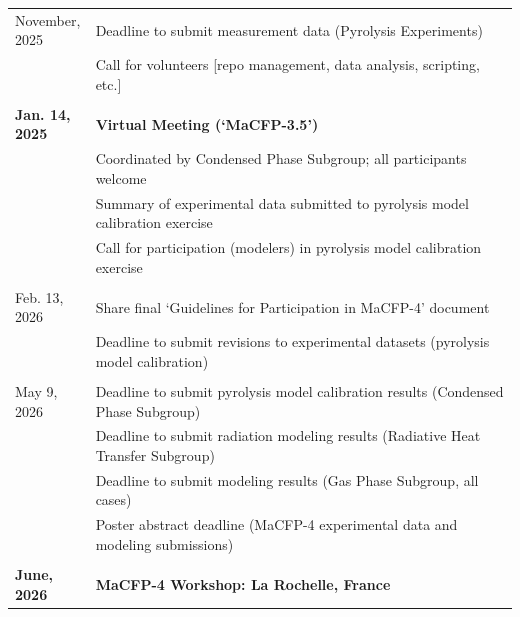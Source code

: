 \documentclass[12pt]{article}
\begin{document}
\begin{table}[h!]
\begin{tabular}{p{0.16\linewidth} |p{0.84\linewidth}}
November, 2025       	& Deadline to submit measurement data (Pyrolysis Experiments)\\
				& Call for volunteers [repo management, data analysis, scripting, etc.]\\
\\
\hline
\textbf{Jan. 14, 2025}	& \textbf{Virtual Meeting (`MaCFP-3.5')}\\
&Coordinated by Condensed Phase Subgroup; all participants welcome\\
&Summary of experimental data submitted to pyrolysis model calibration exercise\\
                       		& Call for participation (modelers) in pyrolysis model calibration exercise\\
                            \\
Feb. 13, 2026       	& Share final `Guidelines for Participation in MaCFP-4' document\\
				& Deadline to submit revisions to experimental datasets (pyrolysis model calibration)\\
\\
May 9, 2026       	& Deadline to submit pyrolysis model calibration results (Condensed Phase Subgroup)\\
                & Deadline to submit radiation modeling results (Radiative Heat Transfer Subgroup)\\
            & Deadline to submit modeling results (Gas Phase Subgroup, all cases)\\ 
				& Poster abstract deadline (MaCFP-4 experimental data and modeling submissions) \\
\\

\hline
\textbf{June, 2026}       	& \textbf{MaCFP-4 Workshop: La Rochelle, France} \\
\hline
\end{tabular}
\end{table}
\normalsize
\end{document}
